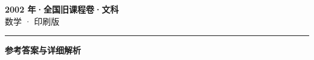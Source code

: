 \documentclass[zihao=5, a4paper]{ctexart}
\begin{document}
\begin{center}
  {\Large\bfseries 2002 年·全国旧课程卷·文科}\\[4pt]
  {\large 数学 · 印刷版}
\end{center}
\medskip
{}

\par\bigskip\hrule\bigskip
{}
\begin{center}{\large\bfseries 参考答案与详细解析}\end{center}
\smallskip

\end{document}
